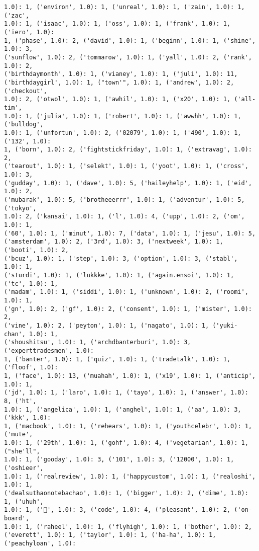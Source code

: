 \documentclass[11pt]{article}
\begin{document}
\begin{Verbatim}[commandchars=\\\{\}]
1.0): 1, ('environ', 1.0): 1, ('unreal', 1.0): 1, ('zain', 1.0): 1, ('zac',
1.0): 1, ('isaac', 1.0): 1, ('oss', 1.0): 1, ('frank', 1.0): 1, ('iero', 1.0):
1, ('phase', 1.0): 2, ('david', 1.0): 1, ('beginn', 1.0): 1, ('shine', 1.0): 3,
('sunflow', 1.0): 2, ('tommarow', 1.0): 1, ('yall', 1.0): 2, ('rank', 1.0): 2,
('birthdaymonth', 1.0): 1, ('vianey', 1.0): 1, ('juli', 1.0): 11,
('birthdaygirl', 1.0): 1, ("town'", 1.0): 1, ('andrew', 1.0): 2, ('checkout',
1.0): 2, ('otwol', 1.0): 1, ('awhil', 1.0): 1, ('x20', 1.0): 1, ('all-tim',
1.0): 1, ('julia', 1.0): 1, ('robert', 1.0): 1, ('awwhh', 1.0): 1, ('bulldog',
1.0): 1, ('unfortun', 1.0): 2, ('02079', 1.0): 1, ('490', 1.0): 1, ('132', 1.0):
1, ('born', 1.0): 2, ('fightstickfriday', 1.0): 1, ('extravag', 1.0): 2,
('tearout', 1.0): 1, ('selekt', 1.0): 1, ('yoot', 1.0): 1, ('cross', 1.0): 3,
('gudday', 1.0): 1, ('dave', 1.0): 5, ('haileyhelp', 1.0): 1, ('eid', 1.0): 2,
('mubarak', 1.0): 5, ('brotheeerrr', 1.0): 1, ('adventur', 1.0): 5, ('tokyo',
1.0): 2, ('kansai', 1.0): 1, ('l', 1.0): 4, ('upp', 1.0): 2, ('om', 1.0): 1,
('60', 1.0): 1, ('minut', 1.0): 7, ('data', 1.0): 1, ('jesu', 1.0): 5,
('amsterdam', 1.0): 2, ('3rd', 1.0): 3, ('nextweek', 1.0): 1, ('booti', 1.0): 2,
('bcuz', 1.0): 1, ('step', 1.0): 3, ('option', 1.0): 3, ('stabl', 1.0): 1,
('sturdi', 1.0): 1, ('lukkke', 1.0): 1, ('again.ensoi', 1.0): 1, ('tc', 1.0): 1,
('madam', 1.0): 1, ('siddi', 1.0): 1, ('unknown', 1.0): 2, ('roomi', 1.0): 1,
('gn', 1.0): 2, ('gf', 1.0): 2, ('consent', 1.0): 1, ('mister', 1.0): 2,
('vine', 1.0): 2, ('peyton', 1.0): 1, ('nagato', 1.0): 1, ('yuki-chan', 1.0): 1,
('shoushitsu', 1.0): 1, ('archdbanterburi', 1.0): 3, ('experttradesmen', 1.0):
1, ('banter', 1.0): 1, ('quiz', 1.0): 1, ('tradetalk', 1.0): 1, ('floof', 1.0):
1, ('face', 1.0): 13, ('muahah', 1.0): 1, ('x19', 1.0): 1, ('anticip', 1.0): 1,
('jd', 1.0): 1, ('laro', 1.0): 1, ('tayo', 1.0): 1, ('answer', 1.0): 8, ('ht',
1.0): 1, ('angelica', 1.0): 1, ('anghel', 1.0): 1, ('aa', 1.0): 3, ('kkk', 1.0):
1, ('macbook', 1.0): 1, ('rehears', 1.0): 1, ('youthcelebr', 1.0): 1, ('mute',
1.0): 1, ('29th', 1.0): 1, ('gohf', 1.0): 4, ('vegetarian', 1.0): 1, ("she'll",
1.0): 1, ('gooday', 1.0): 3, ('101', 1.0): 3, ('12000', 1.0): 1, ('oshieer',
1.0): 1, ('realreview', 1.0): 1, ('happycustom', 1.0): 1, ('realoshi', 1.0): 1,
('dealsuthaonotebachao', 1.0): 1, ('bigger', 1.0): 2, ('dime', 1.0): 1, ('uhuh',
1.0): 1, ('🎵', 1.0): 3, ('code', 1.0): 4, ('pleasant', 1.0): 2, ('on-board',
1.0): 1, ('raheel', 1.0): 1, ('flyhigh', 1.0): 1, ('bother', 1.0): 2,
('everett', 1.0): 1, ('taylor', 1.0): 1, ('ha-ha', 1.0): 1, ('peachyloan', 1.0):

\end{Verbatim}
\end{document}
